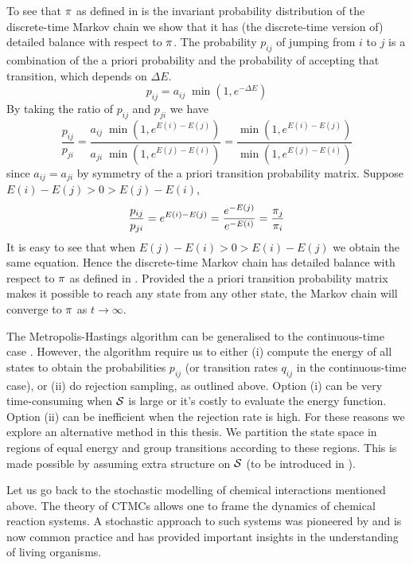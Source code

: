 To see that $\pi$ as defined in  is the invariant
probability distribution of the discrete-time Markov chain
we show that it has (the discrete-time version of)
detailed balance with respect to $\pi$.
The probability $p_{ij}$ of jumping from $i$ to $j$ is
a combination of the a priori probability and
the probability of accepting that transition,
which depends on $\Delta E$.
\[ p_{ij} = a_{ij}\; \min(1, e^{-\Delta E}) \]
By taking the ratio of $p_{ij}$ and $p_{ji}$ we have
\[ \frac{p_{ij}}{p_{ji}} =
   \frac{a_{ij}\; \min(1, e^{E(i)-E(j)})}{
         a_{ji}\; \min(1, e^{E(j)-E(i)})} =
   \frac{\min(1, e^{E(i)-E(j)})}{
         \min(1, e^{E(j)-E(i)})} \]
since $a_{ij} = a_{ji}$ by symmetry of the
a priori transition probability matrix.
Suppose $E(i)-E(j) > 0 > E(j)-E(i)$,
\[ \frac{p_{ij}}{p_{ji}} = e^{E(i)-E(j)}
     = \frac{e^{-E(j)}}{e^{-E(i)}} = \frac{\pi_{j}}{\pi_{i}} \]
It is easy to see that when
$E(j)-E(i) > 0 > E(i)-E(j)$ we obtain the same equation.
Hence the discrete-time Markov chain has detailed balance
with respect to $\pi$ as defined in .
Provided the a priori transition probability matrix
makes it possible to reach any state from any other state,
the Markov chain will converge to $\pi$ as $t \to \infty$.

The Metropolis-Hastings algorithm can be generalised
to the continuous-time case \citep{diaconis}.
However, the algorithm require us to either
(i) compute the energy of all states to obtain the probabilities
$p_{ij}$ (or transition rates $q_{ij}$ in the continuous-time case),
or (ii) do rejection sampling, as outlined above.
Option (i) can be very time-consuming when $\mathcal{S}$ is large
or it's costly to evaluate the energy function.
Option (ii) can be inefficient when the rejection rate is high.
For these reasons we explore an alternative method in this thesis.
We partition the state space in regions of equal energy
and group transitions according to these regions.
This is made possible by assuming extra structure on $\mathcal{S}$
(to be introduced in ).

Let us go back to the stochastic modelling of
chemical interactions mentioned above.
The theory of CTMCs allows one to frame
the dynamics of chemical reaction systems.
A stochastic approach to such systems
was pioneered by \citet{delbruck}
and is now common practice %
and has provided important insights
in the understanding of living organisms. %

